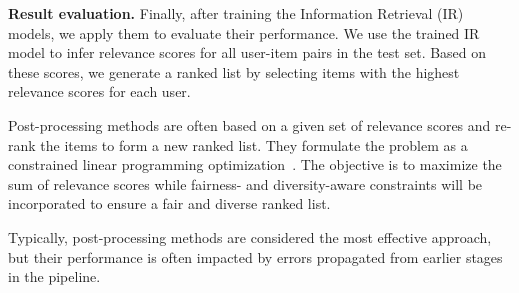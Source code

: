 \noindent\textbf{Result evaluation.}
Finally, after training the Information Retrieval (IR) models, we apply them to evaluate their performance. We use the trained IR model to infer relevance scores for all user-item pairs in the test set. Based on these scores, we  generate a ranked list by selecting items with the highest relevance scores for each user.

Post-processing methods are often based on a given set of relevance scores and re-rank the items to form a new ranked list. They formulate the problem as a constrained linear programming optimization~\cite{fairrec, xu2023p, TaxRank}. The objective is to maximize the sum of relevance scores while fairness- and diversity-aware constraints will be incorporated to ensure a fair and diverse ranked list. 

Typically, post-processing methods are considered the most effective approach, but their performance is often impacted by errors propagated from earlier stages in the pipeline.
